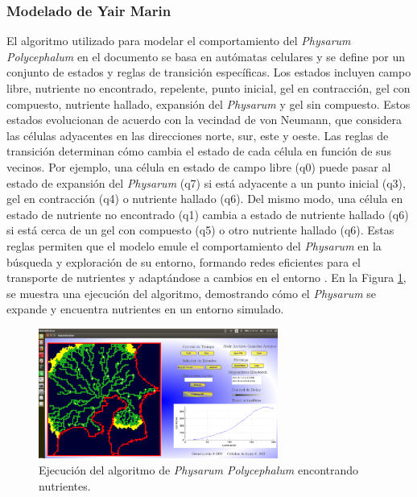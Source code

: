 \subsubsection{Modelado de Yair Marin} %
\label{ssub:ModeladodeYairMarin}
    El algoritmo utilizado para modelar el comportamiento del \textit{Physarum Polycephalum} 
        en el documento se basa en aut\'omatas celulares y se define por un conjunto de estados 
        y reglas de transici\'on espec\'ificas. Los estados incluyen campo libre, nutriente no 
        encontrado, repelente, punto inicial, gel en contracci\'on, gel con compuesto, 
        nutriente hallado, expansi\'on del \textit{Physarum} y gel sin compuesto. 
        Estos estados evolucionan de acuerdo con la vecindad de von Neumann, que 
        considera las c\'elulas adyacentes en las direcciones norte, sur, este y oeste.
    \vskip 0.5cm
    Las reglas de transici\'on determinan c\'omo cambia el estado de cada c\'elula en funci\'on de 
        sus vecinos. Por ejemplo, una c\'elula en estado de campo libre (q0) puede pasar al 
        estado de expansi\'on del \textit{Physarum} (q7) si est\'a adyacente a un punto inicial 
        (q3), gel en contracci\'on (q4) o nutriente hallado (q6). Del mismo modo, una c\'elula en 
        estado de nutriente no encontrado (q1) cambia a estado de nutriente hallado (q6) si 
        est\'a cerca de un gel con compuesto (q5) o otro nutriente hallado (q6). Estas reglas 
        permiten que el modelo emule el comportamiento del \textit{Physarum} en la b\'usqueda y 
        exploraci\'on de su entorno, formando redes eficientes para el transporte de nutrientes 
        y adapt\'andose a cambios en el entorno \cite{MarinAlavez2018}.
    \vskip 0.5cm
    En la Figura \ref{fig:algorithm_running}, se muestra una ejecuci\'on del algoritmo, demostrando 
        c\'omo el \textit{Physarum} se expande y encuentra nutrientes en un entorno simulado.

    \begin{figure}[h]
        \centering
        \includegraphics[width=0.7\textwidth]{./images/estado_del_arte/physarum/yahirPrograma.png}
        \caption{Ejecuci\'on del algoritmo de \textit{Physarum Polycephalum} encontrando nutrientes. \cite{MarinAlavez2018}}
        \label{fig:algorithm_running}
    \end{figure}
